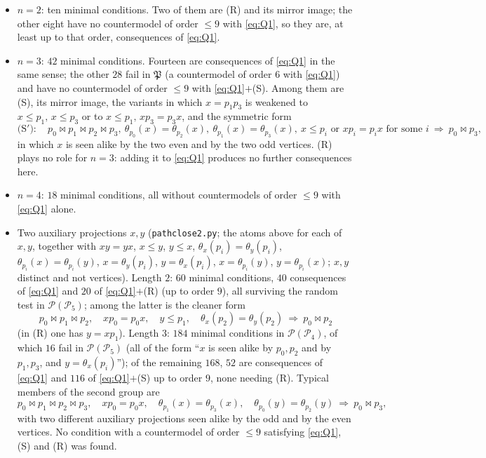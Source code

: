 \documentclass[11pt]{amsart}
\theoremstyle{definition}
\renewcommand{\P}{\mathcal{P}}
\begin{document}
\begin{itemize}[nosep]
\item $n=2$: ten minimal conditions. Two of them are (R) and its mirror image; the other eight have no countermodel of order $\le9$ with \eqref{eq:Q1}, so they are, at least up to that order, consequences of \eqref{eq:Q1}.
\item $n=3$: $42$ minimal conditions. Fourteen are consequences of \eqref{eq:Q1} in the same sense; the other $28$ fail in $\mathfrak P$ (a countermodel of order $6$ with \eqref{eq:Q1}) and have no countermodel of order $\le9$ with \eqref{eq:Q1}$+$(S). Among them are (S), its mirror image, the variants in which $x=p_1p_3$ is weakened to $x\le p_1,\,x\le p_3$ or to $x\le p_1,\,xp_3=p_3x$, and the symmetric form
\[
\text{(S$'$)}:\quad p_0\bowtie p_1\bowtie p_2\bowtie p_3,\ \theta_{p_0}(x)=\theta_{p_2}(x),\ \theta_{p_1}(x)=\theta_{p_3}(x),\ x\le p_i\text{ or }xp_i=p_ix\text{ for some }i\ \Longrightarrow\ p_0\bowtie p_3,
\]
in which $x$ is seen alike by the two even and by the two odd vertices. (R) plays no role for $n=3$: adding it to \eqref{eq:Q1} produces no further consequences here.
\item $n=4$: $18$ minimal conditions, all without countermodels of order $\le9$ with \eqref{eq:Q1} alone.
\item Two auxiliary projections $x,y$ (\texttt{pathclose2.py}; the atoms above for each of $x,y$, together with $xy=yx$, $x\le y$, $y\le x$, $\theta_x(p_i)=\theta_y(p_i)$, $\theta_{p_i}(x)=\theta_{p_i}(y)$, $x=\theta_y(p_i)$, $y=\theta_x(p_i)$, $x=\theta_{p_i}(y)$, $y=\theta_{p_i}(x)$; $x,y$ distinct and not vertices). Length $2$: $60$ minimal conditions, $40$ consequences of \eqref{eq:Q1} and $20$ of \eqref{eq:Q1}$+$(R) (up to order $9$), all surviving the random test in $\P(\P_5)$; among the latter is the cleaner form
\[
p_0\bowtie p_1\bowtie p_2,\quad xp_0=p_0x,\quad y\le p_1,\quad \theta_x(p_2)=\theta_y(p_2)\ \Longrightarrow\ p_0\bowtie p_2
\]
(in (R) one has $y=xp_1$). Length $3$: $184$ minimal conditions in $\P(\P_4)$, of which $16$ fail in $\P(\P_5)$ (all of the form ``$x$ is seen alike by $p_0,p_2$ and by $p_1,p_3$, and $y=\theta_x(p_i)$''); of the remaining $168$, $52$ are consequences of \eqref{eq:Q1} and $116$ of \eqref{eq:Q1}$+$(S) up to order $9$, none needing (R). Typical members of the second group are
\[
p_0\bowtie p_1\bowtie p_2\bowtie p_3,\quad xp_0=p_0x,\quad \theta_{p_1}(x)=\theta_{p_3}(x),\quad \theta_{p_0}(y)=\theta_{p_2}(y)\ \Longrightarrow\ p_0\bowtie p_3 ,
\]
with two different auxiliary projections seen alike by the odd and by the even vertices. No condition with a countermodel of order $\le9$ satisfying \eqref{eq:Q1}, (S) and (R) was found.
\end{itemize}
\end{document}
